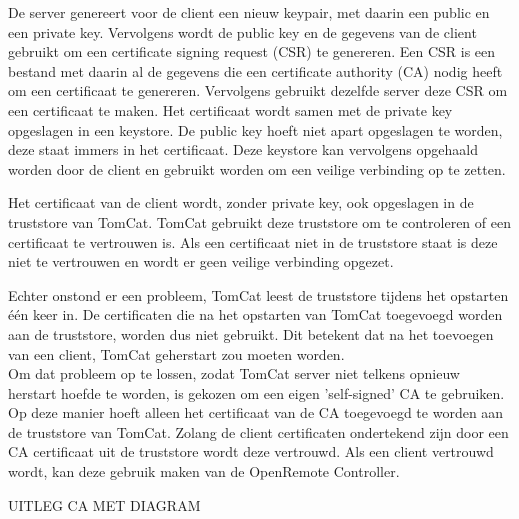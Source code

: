 \documentclass[]{article}
\begin{document}
De server genereert voor de client een nieuw keypair, met daarin een
public en een private key. Vervolgens wordt de public key en de gegevens van de
client gebruikt om een certificate signing request (CSR) te genereren. Een
CSR is een bestand met daarin al de gegevens die een certificate authority (CA)
nodig heeft om een certificaat te genereren. Vervolgens gebruikt dezelfde server
deze CSR om een certificaat te maken. Het certificaat wordt samen met de private
key opgeslagen in een keystore. De public key hoeft niet apart opgeslagen te
worden, deze staat immers in het certificaat. Deze keystore kan vervolgens
opgehaald worden door de client en gebruikt worden om een veilige verbinding op
te zetten.

Het certificaat van de client wordt, zonder private key, ook opgeslagen in de
truststore van TomCat. TomCat gebruikt deze truststore om te controleren of een
certificaat te vertrouwen is. Als een certificaat niet in de truststore staat
is deze niet te vertrouwen en wordt er geen veilige verbinding opgezet. 

Echter onstond er een probleem, TomCat leest de truststore tijdens het opstarten
\'e\'en keer in. De certificaten die na het opstarten van TomCat toegevoegd
worden aan de truststore, worden dus niet gebruikt. Dit betekent dat na het
toevoegen van een client, TomCat geherstart zou moeten  worden. 
\\Om dat probleem op te lossen, zodat TomCat server niet
telkens opnieuw herstart hoefde te worden, is gekozen om een eigen
'self-signed' CA te gebruiken. Op deze manier hoeft alleen het certificaat van
de CA toegevoegd te worden aan de truststore van TomCat.  Zolang de client
certificaten ondertekend zijn door een CA certificaat uit de
truststore wordt deze vertrouwd. Als een client vertrouwd wordt, kan deze
gebruik maken van de OpenRemote Controller.

UITLEG CA MET DIAGRAM
\end{document}
